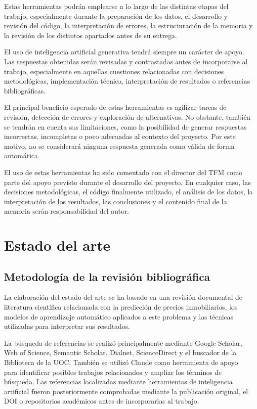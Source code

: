 \documentclass[IB]{TFUOC}%
\begin{document}
Estas herramientas podrán emplearse a lo largo de las distintas etapas del trabajo, especialmente durante la preparación de los datos, el desarrollo y revisión del código, la interpretación de errores, la estructuración de la memoria y la revisión de los distintos apartados antes de su entrega.

El uso de inteligencia artificial generativa tendrá siempre un carácter de apoyo. Las respuestas obtenidas serán revisadas y contrastadas antes de incorporarse al trabajo, especialmente en aquellas cuestiones relacionadas con decisiones metodológicas, implementación técnica, interpretación de resultados o referencias bibliográficas.

El principal beneficio esperado de estas herramientas es agilizar tareas de revisión, detección de errores y exploración de alternativas. No obstante, también se tendrán en cuenta sus limitaciones, como la posibilidad de generar respuestas incorrectas, incompletas o poco adecuadas al contexto del proyecto. Por este motivo, no se considerará ninguna respuesta generada como válida de forma automática.

El uso de estas herramientas ha sido comentado con el director del TFM como parte del apoyo previsto durante el desarrollo del proyecto. En cualquier caso, las decisiones metodológicas, el código finalmente utilizado, el análisis de los datos, la interpretación de los resultados, las conclusiones y el contenido final de la memoria serán responsabilidad del autor.


\chapter{Estado del arte}

\section{Metodología de la revisión bibliográfica}

La elaboración del estado del arte se ha basado en una revisión documental de literatura científica relacionada con la predicción de precios inmobiliarios, los modelos de aprendizaje automático aplicados a este problema y las técnicas utilizadas para interpretar sus resultados.

La búsqueda de referencias se realizó principalmente mediante Google Scholar, Web of Science, Semantic Scholar, Dialnet, ScienceDirect y el buscador de la Biblioteca de la UOC. También se utilizó Claude como herramienta de apoyo para identificar posibles trabajos relacionados y ampliar los términos de búsqueda. Las referencias localizadas mediante herramientas de inteligencia artificial fueron posteriormente comprobadas mediante la publicación original, el DOI o repositorios académicos antes de incorporarlas al trabajo.
\end{document}
